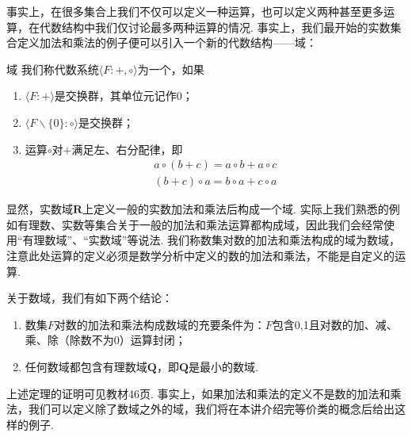 事实上，在很多集合上我们不仅可以定义一种运算，也可以定义两种甚至更多运算，在代数结构中我们仅讨论最多两种运算的情况. 事实上，我们最开始的实数集合定义加法和乘法的例子便可以引入一个新的代数结构——域：
\begin{definition}{域}{} 
    我们称代数系统$\langle F:+,\circ\rangle$为一个，如果
    \begin{enumerate}
        \item $\langle F:+\rangle$是交换群，其单位元记作0；

        \item $\langle F\backslash\{0\}:\circ\rangle$是交换群；

        \item 运算$\circ$对$+$满足左、右分配律，即
              \begin{gather*}
                  a\circ(b+c)=a\circ b+a\circ c \\
                  (b+c)\circ a=b\circ a+c\circ a
              \end{gather*}
    \end{enumerate}
\end{definition}

显然，实数域$\mathbf{R}$上定义一般的实数加法和乘法后构成一个域. 实际上我们熟悉的例如有理数、实数等集合关于一般的加法和乘法运算都构成域，因此我们会经常使用``有理数域''、``实数域''等说法. 我们称数集对数的加法和乘法构成的域为数域，注意此处运算的定义必须是数学分析中定义的数的加法和乘法，不能是自定义的运算.
\begin{theorem}{}{}
    关于数域，我们有如下两个结论：
    \begin{enumerate}
        \item 数集$F$对数的加法和乘法构成数域的充要条件为：$F$包含0,1且对数的加、减、乘、除（除数不为0）运算封闭；

        \item 任何数域都包含有理数域$\mathbf{Q}$，即$\mathbf{Q}$是最小的数域.
    \end{enumerate}
\end{theorem}

上述定理的证明可见教材46页. 事实上，如果加法和乘法的定义不是数的加法和乘法，我们可以定义除了数域之外的域，我们将在本讲介绍完等价类的概念后给出这样的例子.

